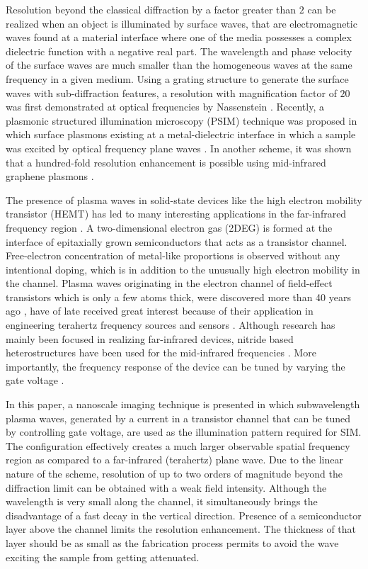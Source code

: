 \documentclass[11pt]{article}
\begin{document}
Resolution beyond the classical diffraction by a factor greater than $2$ can be realized when an object is illuminated by surface waves, that are electromagnetic waves found at a material interface where one of the media possesses a complex dielectric function with a negative real part. The wavelength and phase velocity of the surface waves are much smaller than the homogeneous waves at the same frequency in a given medium. Using a grating structure to generate the surface waves with sub-diffraction features, a resolution with magnification factor of $20$ was first demonstrated at optical frequencies by Nassenstein \cite{Nassenstein1970}. Recently, a plasmonic structured illumination microscopy (PSIM) technique was proposed in which surface plasmons existing at a metal-dielectric interface in which a sample was excited by  optical frequency plane waves \cite{Wei2010}. In another scheme, it was shown that a hundred-fold resolution enhancement is possible using mid-infrared graphene plasmons \cite{Zeng2014}.

The presence of plasma waves in solid-state devices like the high electron mobility transistor (HEMT) has led to many interesting applications in the far-infrared frequency region \cite{Dyer_2016, Wu2015}. A two-dimensional electron gas (2DEG) is formed at the interface of epitaxially grown semiconductors that acts as a transistor channel. Free-electron concentration of metal-like proportions is observed without any intentional doping, which is in addition to the unusually high electron mobility in the channel. Plasma waves originating in the electron channel of field-effect transistors which is only a few atoms thick, were discovered more than 40 years ago \cite{Stern1967a, Allen1977}, have of late received great interest because of their application in engineering terahertz frequency sources and sensors \cite{Dyakonov1993, Dyakonov1996, Popov2005, Otsuji2006, Dyakonov2005}. Although research has mainly been focused in realizing far-infrared devices, nitride based heterostructures have been used for the mid-infrared frequencies
\cite{Hofstetter2002}. More importantly, the frequency response of the device can be tuned by varying the gate voltage \cite{Fatimy2010, Rabbaa2011}.

In this paper, a nanoscale imaging technique is presented in which subwavelength plasma waves, generated by a current in a transistor channel that can be tuned by controlling gate voltage, are used as the illumination pattern required for SIM. The configuration effectively creates a much larger observable spatial frequency region as compared to a far-infrared (terahertz) plane wave. Due to the linear nature of the scheme, resolution of up to two orders of magnitude beyond the diffraction limit can be obtained with a weak field intensity. Although the wavelength is very small along the channel, it simultaneously brings the disadvantage of a fast decay in the vertical direction. Presence of a semiconductor layer above the channel limits the resolution enhancement. The thickness of that layer should be as small as the fabrication process permits to avoid the wave exciting the sample from getting attenuated.
\end{document}
